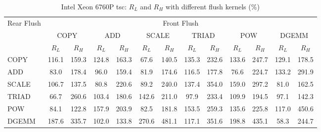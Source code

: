 \begin{table}[htbp]
\centering
\caption{Intel Xeon 6760P tsc: $R_L$ and $R_H$ with different flush kernels (\%)}
\label{tab:frkern-cgnr6760pn2-tsc}
\begin{tabular*}{\textwidth}{@{\extracolsep{\fill}}lcccccccccccc}
\toprule
\multirow{3}{*}{Rear Flush} & \multicolumn{12}{c}{Front Flush} \\ \cmidrule(lr){2-13}
& \multicolumn{2}{c}{COPY} & \multicolumn{2}{c}{ADD} & \multicolumn{2}{c}{SCALE} & \multicolumn{2}{c}{TRIAD} & \multicolumn{2}{c}{POW} & \multicolumn{2}{c}{DGEMM} \\ \cmidrule(lr){2-3} \cmidrule(lr){4-5} \cmidrule(lr){6-7} \cmidrule(lr){8-9} \cmidrule(lr){10-11} \cmidrule(lr){12-13}
& $R_L$ & $R_H$ & $R_L$ & $R_H$ & $R_L$ & $R_H$ & $R_L$ & $R_H$ & $R_L$ & $R_H$ & $R_L$ & $R_H$ \\ \midrule
COPY & 116.1 & 159.3 & 124.8 & 163.3 & 67.6 & 140.5 & 135.3 & 232.6 & 133.6 & 247.7 & 129.1 & 178.5 \\
ADD & 83.0 & 178.4 & 96.0 & 159.4 & 81.9 & 174.6 & 116.5 & 177.8 & 76.6 & 224.7 & 133.2 & 291.9 \\
SCALE & 106.7 & 137.5 & 80.8 & 220.6 & 89.2 & 240.0 & 137.4 & 354.0 & 159.0 & 297.2 & 81.0 & 162.5 \\
TRIAD & 66.7 & 260.6 & 103.4 & 180.6 & 142.6 & 211.0 & 97.9 & 233.4 & 109.9 & 194.5 & 97.1 & 142.3 \\
POW & 84.1 & 122.8 & 157.9 & 203.9 & 82.5 & 181.8 & 153.5 & 259.3 & 135.6 & 225.8 & 117.0 & 450.6 \\
DGEMM & 187.6 & 335.7 & 102.0 & 133.8 & 270.6 & 481.1 & 117.1 & 351.6 & 198.8 & 435.1 & 58.3 & 244.7 \\
\bottomrule
\end{tabular*}
\end{table}